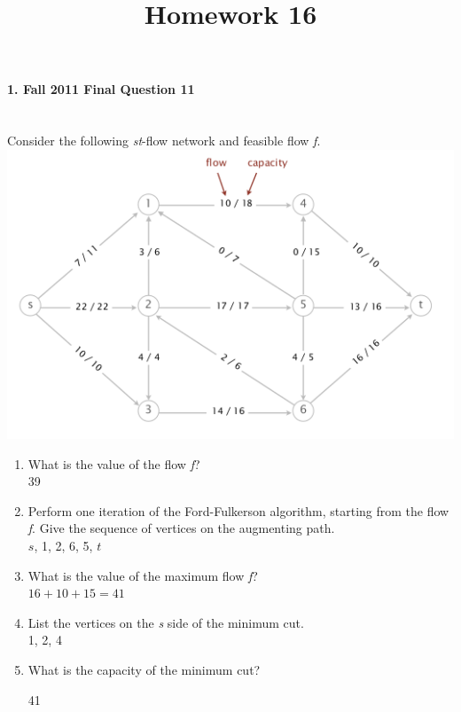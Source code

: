 \documentclass{article}
\begin{document}
\title{Homework 16}
\date{}
\maketitle


\paragraph{\Large 1. Fall 2011 Final Question 11}\mbox{}\\
Consider the following \textit{st}-flow network and feasible flow \textit{f}.\\
\includegraphics[]{fin-f11-11.png}\\
\begin{enumerate}
\renewcommand{\theenumi}{\Alph{enumi}}
	\item What is the value of the flow \textit{f}?\\
	
	39

	\item Perform one iteration of the Ford-Fulkerson algorithm, starting from the flow \textit{f}. Give the sequence of vertices on the augmenting path.\\

	$s$, 1, 2, 6, 5, $t$  

	\item What is the value of the maximum flow \textit{f}?\\
	
	$16 + 10 + 15 = 41$

	\item List the vertices on the \textit{s} side of the minimum cut.\\

	1, 2, 4

	\item What is the capacity of the minimum cut?

	41

\end{enumerate}
\end{document}

